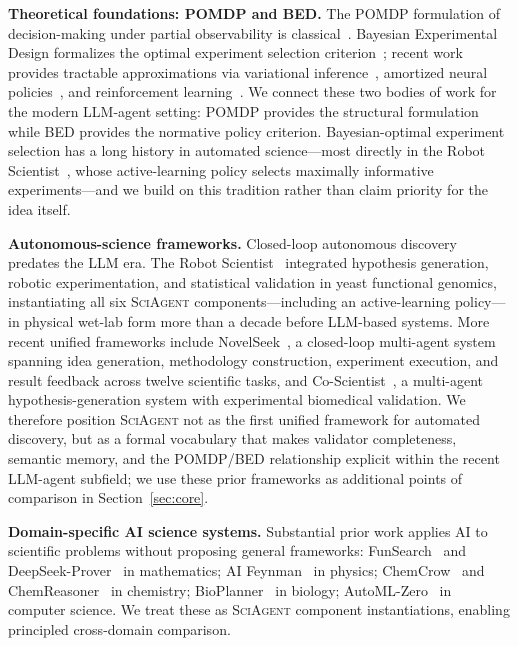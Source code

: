 \documentclass[11pt]{article}
\newcommand{\framework}{\textsc{SciAgent}}
\begin{document}
\textbf{Theoretical foundations: POMDP and BED.} The POMDP formulation of decision-making under partial observability is classical~\citep{kaelbling1998pomdp}. Bayesian Experimental Design formalizes the optimal experiment selection criterion~\citep{chaloner1995bayesian}; recent work provides tractable approximations via variational inference~\citep{foster2019variational}, amortized neural policies~\citep{foster2021dad}, and reinforcement learning~\citep{blau2022rl}. We connect these two bodies of work for the modern LLM-agent setting: POMDP provides the structural formulation while BED provides the normative policy criterion. Bayesian-optimal experiment selection has a long history in automated science---most directly in the Robot Scientist~\citep{sparkes2010robot}, whose active-learning policy selects maximally informative experiments---and we build on this tradition rather than claim priority for the idea itself.

\textbf{Autonomous-science frameworks.} Closed-loop autonomous discovery predates the LLM era. The Robot Scientist~\citep{sparkes2010robot} integrated hypothesis generation, robotic experimentation, and statistical validation in yeast functional genomics, instantiating all six \framework{} components---including an active-learning policy---in physical wet-lab form more than a decade before LLM-based systems. More recent unified frameworks include NovelSeek~\citep{zhang2025novelseek}, a closed-loop multi-agent system spanning idea generation, methodology construction, experiment execution, and result feedback across twelve scientific tasks, and Co-Scientist~\citep{gottweis2026coscientist}, a multi-agent hypothesis-generation system with experimental biomedical validation. We therefore position \framework{} not as the first unified framework for automated discovery, but as a formal vocabulary that makes validator completeness, semantic memory, and the POMDP/BED relationship explicit within the recent LLM-agent subfield; we use these prior frameworks as additional points of comparison in Section~\ref{sec:core}.

\textbf{Domain-specific AI science systems.} Substantial prior work applies AI to scientific problems without proposing general frameworks: FunSearch~\citep{romera2023funsearch} and DeepSeek-Prover~\citep{xin2024deepseek} in mathematics; AI Feynman~\citep{udrescu2020afeynman} in physics; ChemCrow~\citep{bran2023chemcrow} and ChemReasoner~\citep{sprueill2024chemreasoner} in chemistry; BioPlanner~\citep{odonoghue2023bioplanner} in biology; AutoML-Zero~\citep{real2020automlzero} in computer science. We treat these as \framework{} component instantiations, enabling principled cross-domain comparison.
\end{document}

